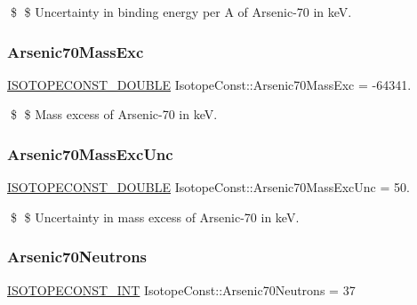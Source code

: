 \$ \$ Uncertainty in binding energy per A of Arsenic-\/70 in keV. \mbox{\label{group___isotope_const-_arsenic-_as70_ga580f2d69b3be32dc2fd550f8ede2d75e}} 
\subsubsection{\texorpdfstring{Arsenic70\+Mass\+Exc}{Arsenic70MassExc}}
{\footnotesize\ttfamily \mbox{\hyperlink{group___isotope_const-_macros_ga8f45a7272ce02c0b4c65c44636ed719a}{I\+S\+O\+T\+O\+P\+E\+C\+O\+N\+S\+T\+\_\+\+D\+O\+U\+B\+LE}} Isotope\+Const\+::\+Arsenic70\+Mass\+Exc = -\/64341.}

\$ \$ Mass excess of Arsenic-\/70 in keV. \mbox{\label{group___isotope_const-_arsenic-_as70_ga4b404951a64cb5bde24d0ce46f25043a}} 
\subsubsection{\texorpdfstring{Arsenic70\+Mass\+Exc\+Unc}{Arsenic70MassExcUnc}}
{\footnotesize\ttfamily \mbox{\hyperlink{group___isotope_const-_macros_ga8f45a7272ce02c0b4c65c44636ed719a}{I\+S\+O\+T\+O\+P\+E\+C\+O\+N\+S\+T\+\_\+\+D\+O\+U\+B\+LE}} Isotope\+Const\+::\+Arsenic70\+Mass\+Exc\+Unc = 50.}

\$ \$ Uncertainty in mass excess of Arsenic-\/70 in keV. \mbox{\label{group___isotope_const-_arsenic-_as70_ga31d1740f30ab05a6d800188cd7417fdc}} 
\subsubsection{\texorpdfstring{Arsenic70\+Neutrons}{Arsenic70Neutrons}}
{\footnotesize\ttfamily \mbox{\hyperlink{group___isotope_const-_macros_ga5f18360b3e99483a35c32d789e62621c}{I\+S\+O\+T\+O\+P\+E\+C\+O\+N\+S\+T\+\_\+\+I\+NT}} Isotope\+Const\+::\+Arsenic70\+Neutrons = 37}

